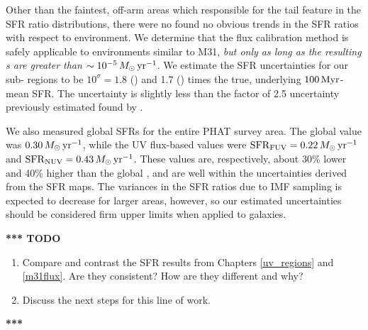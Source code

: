 Other than the faintest, off-arm areas which responsible for the tail feature
in the SFR ratio distributions, there were no found no obvious trends in the
SFR ratios with respect to environment. We determine that the flux calibration
method is safely applicable to environments similar to M31, \emph{but only as
long as the resulting \sfr{}s are greater than $\sim 10^{-5}\,M_\odot\,\mathrm{yr}^{-1}$}. We
estimate the SFR uncertainties for our sub-\kpc{} regions to be $10^\sigma =
1.8$ (\fuv{}) and 1.7 (\nuv{}) times the true, underlying $100\,\mathrm{Myr}$-mean SFR.
The \sfrfuv{} uncertainty is slightly less than the factor of 2.5 uncertainty
previously estimated found by \citet{Simones:2014}.

We also measured global SFRs for the entire PHAT survey area. The global
\sfroneh{} value was $0.30\,M_\odot\,\mathrm{yr}^{-1}$, while the UV flux-based values were
$\mathrm{SFR}_{\mathrm{FUV}} = 0.22\,M_\odot\,\mathrm{yr}^{-1}$ and $\mathrm{SFR}_{\mathrm{NUV}} = 0.43\,M_\odot\,\mathrm{yr}^{-1}$. These values
are, respectively, about 30\% lower and 40\% higher than the global \sfroneh{},
and are well within the uncertainties derived from the SFR maps. The variances
in the SFR ratios due to IMF sampling is expected to decrease for larger areas,
however, so our estimated uncertainties should be considered firm upper limits
when applied to galaxies.

\textbf{*** TODO}

\begin{enumerate}
\item Compare and contrast the SFR results from Chapters \ref{uv_regions} and
    \ref{m31flux}. Are they consistent? How are they different and why?
\item Discuss the next steps for this line of work.
\end{enumerate}

\textbf{***}
